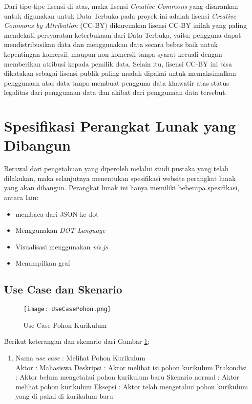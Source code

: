 Dari tipe-tipe lisensi di atas, maka lisensi \textit{Creative Commons} yang disarankan untuk digunakan untuk Data Terbuka pada proyek ini adalah lisensi \textit{Creative Commons by Attribution} (CC-BY) dikarenakan lisensi CC-BY inilah yang paling mendekati persyaratan keterbukaan dari Data Terbuka, yaitu: pengguna dapat mendistribusikan data dan menggunakan data secara bebas baik untuk kepentingan komersil, maupun non-komersil tanpa syarat kecuali dengan memberikan atribusi kepada pemilik data. Selain itu, lisensi CC-BY ini bisa dikatakan sebagai lisensi publik paling mudah dipakai untuk memaksimalkan penggunaan atas data tanpa membuat pengguna data khawatir atas status legalitas dari penggunaan data dan akibat dari penggunaan data tersebut.


\section{Spesifikasi Perangkat Lunak yang Dibangun}
\label{sec: Spesifikasi Perangkat Lunak yang Dibangun}

Berawal dari pengetahuan yang diperoleh melalui studi pustaka yang telah dilakukan, maka selanjutnya
menentukan spesifikasi website perangkat lunak yang akan dibangun. Perangkat lunak ini hanya
memiliki beberapa spesifikasi, antara lain:
\begin{itemize}
\item membaca dari JSON ke dot 
\item Menggunakan \textit{DOT Language}
\item Visualisasi menggunakan \textit{viz.js}
\item Menampilkan graf
\end{itemize}

\subsection{Use Case dan Skenario}
\label{sec: Use Case dan Skenario}

\begin{figure}[H]
		\centering
		\texttt{[image: UseCasePohon.png]}
		\caption{Use Case Pohon Kurikulum}
		\label{fig: Use Case Pohon Kurikulum}
\end{figure}	

Berikut keterangan dan skenario dari Gambar \ref{fig: Use Case Pohon Kurikulum}:
\begin{enumerate}
\item Nama \textit{use case} : Melihat Pohon Kurikulum \\
	  Aktor : Mahasiswa 
	  Deskripsi :  Aktor melihat isi pohon kurikulum 
	  Prakondisi : Aktor belum mengetahui pohon kurikulum baru 
	  Skenario normal : Aktor melihat pohon kurikulum
	  Eksepsi : Aktor telah mengetahui pohon kurikulum yang di pakai di kurikulum baru
	  
\end{enumerate}



